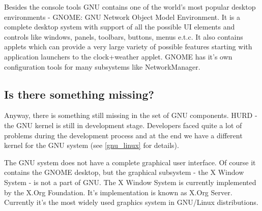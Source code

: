 Besides the console tools GNU contains one of the world's most popular desktop environments - GNOME: GNU Network Object Model Environment. It is a complete desktop system with support of all the possible UI elements and controls like windows, panels, toolbars, buttons, menus e.t.c. It also contains applets which can provide a very large variety of possible features starting with application launchers to the clock+weather applet. GNOME has it's own configuration tools for many subsystems like NetworkManager.

\subsection{Is there something missing?}

Anyway, there is something still missing in the set of GNU components. HURD - the GNU kernel is still in development stage. Developers faced quite a lot of problems during the development process and at the end we have a different kernel for the GNU system (see \ref {gnu_linux} for details). 

The GNU system does not have a complete graphical user interface. Of course it contains the GNOME desktop, but the graphical subsystem - the X Window System - is not a part of GNU. The X Window System is currently implemented by the X.Org Foundation. It's implementation is known as X.Org Server. Currently it's the most widely used graphics system in GNU/Linux distributions.


 
